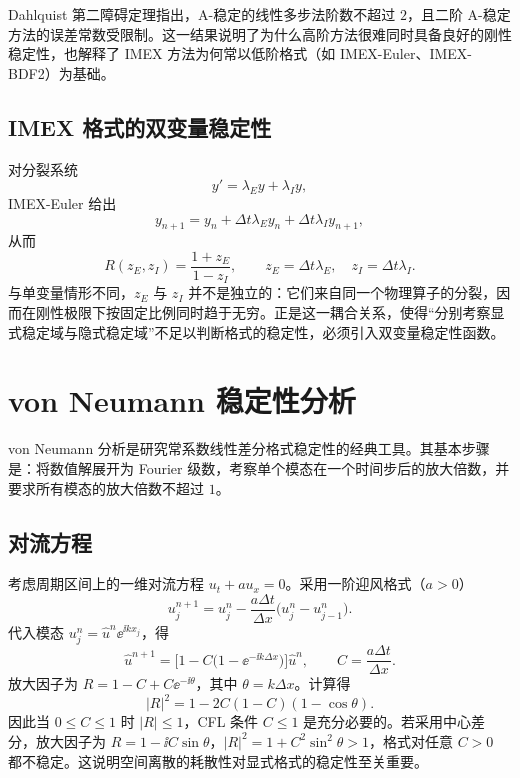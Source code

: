 Dahlquist 第二障碍定理指出，A-稳定的线性多步法阶数不超过 $2$，且二阶 A-稳定方法的误差常数受限制。这一结果说明了为什么高阶方法很难同时具备良好的刚性稳定性，也解释了 IMEX 方法为何常以低阶格式（如 IMEX-Euler、IMEX-BDF2）为基础。

\subsection{IMEX 格式的双变量稳定性}

对分裂系统
\begin{equation}
  y'=\lambda_E y+\lambda_I y,
  \label{eq:split-test}
\end{equation}
IMEX-Euler 给出
\begin{equation}
  y_{n+1}=y_n+\Delta t\lambda_E y_n+\Delta t\lambda_I y_{n+1},
\end{equation}
从而
\begin{equation}
  R(z_E,z_I)=\frac{1+z_E}{1-z_I},\qquad
  z_E=\Delta t\lambda_E,\quad z_I=\Delta t\lambda_I.
  \label{eq:R-two-var}
\end{equation}
与单变量情形不同，$z_E$ 与 $z_I$ 并不是独立的：它们来自同一个物理算子的分裂，因而在刚性极限下按固定比例同时趋于无穷。正是这一耦合关系，使得“分别考察显式稳定域与隐式稳定域”不足以判断格式的稳定性，必须引入双变量稳定性函数。

\section{von Neumann 稳定性分析}
\label{sec:von-neumann}

von Neumann 分析是研究常系数线性差分格式稳定性的经典工具。其基本步骤是：将数值解展开为 Fourier 级数，考察单个模态在一个时间步后的放大倍数，并要求所有模态的放大倍数不超过 $1$。

\subsection{对流方程}

考虑周期区间上的一维对流方程 $u_t+au_x=0$。采用一阶迎风格式（$a>0$）
\begin{equation}
  u_j^{n+1}=u_j^n-\frac{a\Delta t}{\Delta x}\bigl(u_j^n-u_{j-1}^n\bigr).
  \label{eq:upwind}
\end{equation}
代入模态 $u_j^n=\hat u^n\ee^{\ii kx_j}$，得
\begin{equation}
  \hat u^{n+1}=\bigl[1-C\bigl(1-\ee^{-\ii k\Delta x}\bigr)\bigr]\hat u^n,
  \qquad C=\frac{a\Delta t}{\Delta x}.
\end{equation}
放大因子为 $R=1-C+C\ee^{-\ii\theta}$，其中 $\theta=k\Delta x$。计算得
\begin{equation}
  |R|^2=1-2C(1-C)(1-\cos\theta).
\end{equation}
因此当 $0\le C\le1$ 时 $|R|\le1$，CFL 条件 $C\le1$ 是充分必要的。若采用中心差分，放大因子为 $R=1-\ii C\sin\theta$，$|R|^2=1+C^2\sin^2\theta>1$，格式对任意 $C>0$ 都不稳定。这说明空间离散的耗散性对显式格式的稳定性至关重要。

